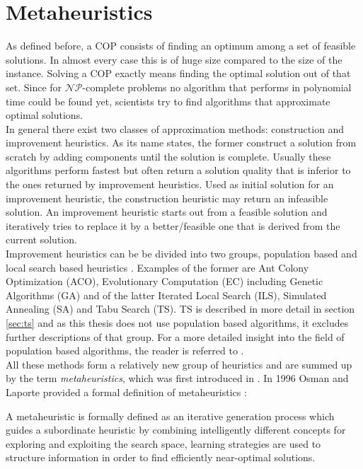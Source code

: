 \section{Metaheuristics}
As defined before, a COP consists of finding an optimum among a set of feasible solutions. In almost every case this is of huge size compared to the size of the instance. Solving a COP exactly means finding the optimal solution out of that set. Since for $\mathcal{NP}$-complete problems no algorithm that performs in polynomial time could be found yet, scientists try to find algorithms that approximate optimal solutions.\\
In general there exist two classes of approximation methods: construction and improvement heuristics. As its name states, the former construct a solution from scratch by adding components until the solution is complete. Usually these algorithms perform fastest but often return a solution quality that is inferior to the ones returned by improvement heuristics. Used as initial solution for an improvement heuristic, the construction heuristic may return an infeasible solution. An improvement heuristic starts out from a feasible solution and iteratively tries to replace it by a better/feasible one that is derived from the current solution.\\
Improvement heuristics can be be divided into two groups, population based and local search based heuristics \cite{blum-05}. Examples of the former are Ant Colony Optimization (ACO), Evolutionary Computation (EC) including Genetic Algorithms (GA) and of the latter Iterated Local Search (ILS), Simulated Annealing (SA) and Tabu Search (TS). TS is described in more detail in section \ref{sec:ts} and as this thesis does not use population based algorithms, it excludes further descriptions of that group. For a more detailed insight into the field of population based algorithms, the reader is referred to \cite{gendreau-10}.\\
All these methods form a relatively new group of heuristics and are summed up by the term \textit{metaheuristics}, which was first introduced in \cite{glover-86}. In 1996 Osman and Laporte provided a formal definition of metaheuristics \cite{osman-96}:
\begin{definition}[Metaheuristic]
A metaheuristic is formally defined as an iterative generation process which guides a subordinate heuristic by combining intelligently different concepts for exploring and exploiting the search space, learning strategies are used to structure information in order to find efficiently near-optimal solutions.
\end{definition}
